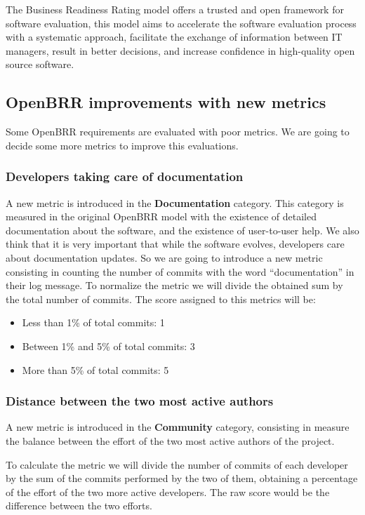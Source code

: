 \documentclass[a4paper,10pt]{article}
\begin{document}
The Business Readiness Rating model offers a trusted and open framework for
software evaluation, this model aims to accelerate the software evaluation
process with a systematic approach, facilitate the exchange of information
between IT managers, result in better decisions, and increase confidence in
high-quality open source software.

\subsection{OpenBRR improvements with new metrics}
\label{OpenBRRimprovements}
Some OpenBRR requirements are evaluated with poor metrics. We are going to
decide some more metrics to improve this evaluations.
\subsubsection{Developers taking care of documentation}
\label{NewMetricLarjona1}
A new metric is introduced in the \textbf{Documentation} category. This
category is measured in the original OpenBRR model with the existence of
detailed documentation about the software, and the existence of user-to-user
help. We also think that it is very important that while the software evolves,
developers care about documentation updates. So we are going to introduce a new
metric consisting in counting the number of commits with the word
``documentation'' in their log message. To normalize the metric we will
divide the obtained sum by the total number of commits. The score assigned to
this metrics will be:
\begin{itemize}
 \item Less than 1\% of total commits: 1
 \item Between 1\% and 5\% of total commits: 3
 \item More than 5\% of total commits: 5
\end{itemize}

\subsubsection{Distance between the two most active authors}
\label{NewMetricLarjona2}
A new metric is introduced in the \textbf{Community} category, consisting in
measure the balance between the effort of the two most active authors of the
project.

To calculate the metric we will divide the number of commits of each developer
by the sum of the commits performed by the two of them, obtaining a percentage
of the effort of the two more active developers. The raw score would be the
difference between the two efforts.
\end{document}
